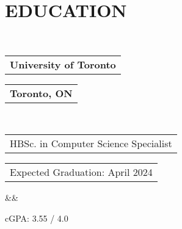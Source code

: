 \documentclass[12pt,letterpaper,roman]{moderncv}
\makeatletter
\def \headingSpace {-11mm} %
\def \scaleHeadings {1.19}
\newcommand*{\customcventry}[7][.25em]{
  \begin{tabular}{@{}l}
    {\relscale{\scaleHeadings}\bfseries #4}
  \end{tabular}
  \hfill%
  \begin{tabular}{l@{}}
     {\bfseries #5}
  \end{tabular} \\
  \begin{tabular}{@{}l}
    {#3}
  \end{tabular}
  \hfill%
  \begin{tabular}{l@{}}
     {#2}
  \end{tabular}
  \ifx&#7&
  \else{\\
    \begin{minipage}{\maincolumnwidth}
      \small#7
    \end{minipage}}\fi
  \par\addvspace{#1}}
\makeatother
\begin{document}
\section{EDUCATION} \leavevmode \\[\headingSpace]
{\customcventry{Expected Graduation: April 2024}{HBSc. in Computer Science Specialist}{University of Toronto}{Toronto, ON}{}{}}
\vspace*{-1.5mm}
cGPA: 3.55 / 4.0
\end{document}
